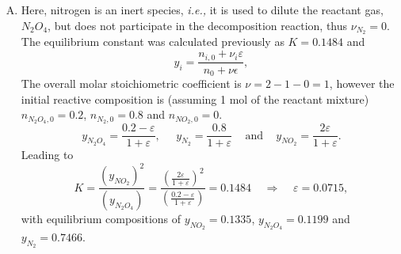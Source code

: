 \documentclass[calculator,allquestions,datasheet,mock,solutions]{exam_newMarcus2}
\newcommand{\frc}{\displaystyle\frac}
\newcommand{\ie}{{\it i.e., }}
\begin{document}
\begin{question}
\begin{enumerate}[a)]
{\begin{enumerate}[A.]
           \item Here, nitrogen is an inert species, \ie it is used to dilute the reactant gas, $N_{2}O_{4}$, but does not participate in the decomposition reaction, thus $\nu_{N_{2}}=0$.  The equilibrium constant was calculated previously as $K = 0.1484$ and 
         \begin{displaymath}
            y_{i} = \frc{n_{i,0} + \nu_{i}\varepsilon}{n_{0}+\nu\epsilon},
         \end{displaymath}
        The overall molar stoichiometric coefficient is $\nu= 2-1-0 = 1$, however the initial reactive composition is (assuming 1 mol of the reactant mixture) $n_{N_{2}O_{4},0} = 0.2$, $n_{N_{2},0} = 0.8$ and $n_{NO_{2},0}=0$.
         \begin{displaymath}
           y_{N_{2}O_{4}} = \frc{0.2-\varepsilon}{1+\varepsilon},\;\;\;\;\; y_{N_{2}} = \frc{0.8}{1+\varepsilon}\;\;\;\text{ and }\;\;\;y_{NO_{2}} = \frc{2\varepsilon}{1+\varepsilon}.
         \end{displaymath}
         Leading to~ 
         \begin{displaymath}
             K = \frac{\left(y_{NO_{2}}\right)^{2}}{\left(y_{N_{2}O_{4}}\right)} = \frc{\left(\frc{2\varepsilon}{1+\varepsilon}\right)^{2}}{\left(\frc{0.2-\varepsilon}{1+\varepsilon}\right)} = 0.1484 \;\;\;\;\Longrightarrow\;\;\;\; \varepsilon = 0.0715,
         \end{displaymath}
         with equilibrium compositions of $y_{NO_{2}} = 0.1335$, $y_{N_{2}O_{4}} = 0.1199$ and $y_{N_{2}} = 0.7466$.~ 


\end{enumerate}}
\end{enumerate}
\end{question}
\end{document}
